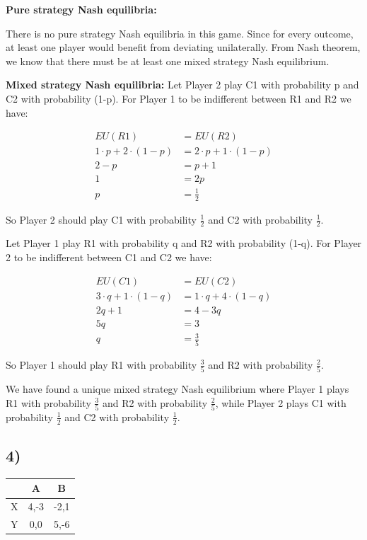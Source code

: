 \documentclass[10pt]{article}
\begin{document}
\noindent
\textbf{Pure strategy Nash equilibria:}

There is no pure strategy Nash equilibria in this game. Since for every outcome, at least one player would benefit from deviating unilaterally. From Nash theorem, we know that there must be at least one mixed strategy Nash equilibrium.

\noindent
\textbf{Mixed strategy Nash equilibria:}
Let Player 2 play C1 with probability p and C2 with probability (1-p). For Player 1 to be indifferent between R1 and R2 we have:

\begin{align*}
EU(R1) &= EU(R2) \\
1 \cdot p + 2 \cdot (1-p) &= 2 \cdot p + 1 \cdot (1-p) \\
2 - p &= p + 1 \\
1 &= 2p \\
p &= \frac{1}{2}
\end{align*}

So Player 2 should play C1 with probability $\frac{1}{2}$ and C2 with probability $\frac{1}{2}$.

Let Player 1 play R1 with probability q and R2 with probability (1-q). For Player 2 to be indifferent between C1 and C2 we have:

\begin{align*}
EU(C1) &= EU(C2) \\
3 \cdot q + 1 \cdot (1-q) &= 1 \cdot q + 4 \cdot (1-q) \\
2q + 1 &= 4 - 3q \\
5q &= 3 \\
q &= \frac{3}{5}
\end{align*}

So Player 1 should play R1 with probability $\frac{3}{5}$ and R2 with probability $\frac{2}{5}$.

We have found a unique mixed strategy Nash equilibrium where Player 1 plays R1 with probability $\frac{3}{5}$ and R2 with probability $\frac{2}{5}$, while Player 2 plays C1 with probability $\frac{1}{2}$ and C2 with probability $\frac{1}{2}$.

\subsection*{4)}

\begin{tabular}{c|c|c}
& A & B \\
\hline
X & 4,-3 & -2,1 \\
\hline
Y & 0,0 & 5,-6 \\
\end{tabular}
\end{document}
